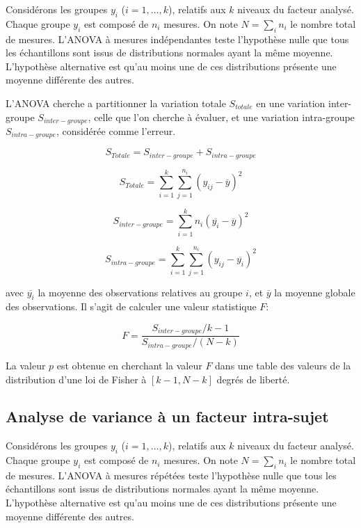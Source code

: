 Considérons les groupes $y_i$ ($i=1,\ldots,k$), relatifs aux $k$ niveaux du facteur analysé. Chaque groupe $y_i$ est composé de $n_i$ mesures. On note $N=\sum\limits_i n_i$ le nombre total de mesures. L'ANOVA à mesures indépendantes teste l'hypothèse nulle que tous les échantillons sont issus de distributions normales ayant la même moyenne. L'hypothèse alternative est qu'au moins une de ces distributions présente une moyenne différente des autres.

L'ANOVA cherche a partitionner la variation totale $S_{totale}$ en une variation inter-groupe $S_{inter-groupe}$, celle que l'on cherche à évaluer, et une variation intra-groupe $S_{intra-groupe}$, considérée comme l'erreur.

\begin{equation}
S_{Totale}= S_{inter-groupe} + S_{intra-groupe}
\end{equation}

\begin{equation}
S_{Totale}=\sum_{i=1}^k \sum_{j=1}^{n_i} (y_{ij}-\overline{y})^2
\end{equation}

\begin{equation}
S_{inter-groupe}=\sum_{i=1}^k n_i(\overline{y_i} - \overline{y})^2 
\end{equation}

\begin{equation}
S_{intra-groupe}=\sum_{i=1}^k \sum_{j=1}^{n_i} (y_{ij} - \overline{y_i})^2
\end{equation}


avec $\overline{y_i}$ la moyenne des observations relatives au groupe $i$, et $\overline{y}$ la moyenne globale des observations. Il s'agit de calculer une valeur statistique $F$:

\begin{equation}
F=\dfrac{S_{inter-groupe}/k-1}{S_{intra-groupe}/(N-k)}
\end{equation}

La valeur $p$ est obtenue en cherchant la valeur $F$ dans une table des valeurs de la distribution d'une loi de Fisher à $[k-1,N-k]$ degrés de liberté.

\subsection{Analyse de variance à un facteur intra-sujet}

Considérons les groupes $y_i$ ($i=1,\ldots,k$), relatifs aux $k$ niveaux du facteur analysé. Chaque groupe $y_i$ est composé de $n_i$ mesures. On note $N=\sum\limits_i n_i$ le nombre total de mesures. L'ANOVA à mesures répétées teste l'hypothèse nulle que tous les échantillons sont issus de distributions normales ayant la même moyenne. L'hypothèse alternative est qu'au moins une de ces distributions présente une moyenne différente des autres.

